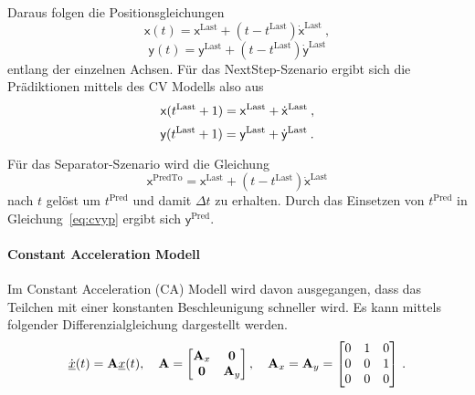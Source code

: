 Daraus folgen die Positionsgleichungen 
\begin{equation*}
    \mathsf{x}(t) = \mathsf{x}^{\text{Last}} + (t - t^{\text{Last}})\dot{\mathsf{x}}^{\text{Last}} \: ,
\end{equation*}
\begin{equation*}
    \mathsf{y}(t) = \mathsf{y}^{\text{Last}} + (t - t^{\text{Last}})\dot{\mathsf{y}}^{\text{Last}}
\end{equation*}
% 
entlang der einzelnen Achsen.
Für das NextStep-Szenario ergibt sich die Prädiktionen mittels des CV Modells also aus
\begin{equation*}
    \mathsf{x}(t{^{\text{Last}}}+1) = \mathsf{x}^{\text{Last}} + \dot{\mathsf{x}}^{\text{Last}} \: ,
\end{equation*}
\begin{equation}
    \label{eq:cvyp}
    \mathsf{y}(t{^{\text{Last}}}+1) = \mathsf{y}^{\text{Last}} + \dot{\mathsf{y}}^{\text{Last}} \: .
\end{equation}

Für das Separator-Szenario wird die Gleichung 
% 
\begin{equation*}
    \mathsf{x}^{\text{PredTo}} = \mathsf{x}^{\text{Last}} + (t - t^{\text{Last}})\dot{\mathsf{x}}^{\text{Last}}
\end{equation*}
% 
nach \(t\) gelöst um  \(t^{\text{Pred}}\) und damit \(\Delta t\) zu erhalten.
Durch das Einsetzen von \(t^{\text{Pred}}\) in Gleichung~\eqref{eq:cvyp} ergibt sich \(\mathsf{y}^{\text{Pred}}\).

\paragraph{Constant Acceleration Modell}

Im Constant Acceleration (CA) Modell wird davon ausgegangen, dass das Teilchen mit einer konstanten Beschleunigung schneller wird.
Es kann mittels folgender Differenzialgleichung dargestellt werden.
% 
\begin{align*} \label{eq:CADiff}
    \dot{{\underline{x}}}(t) = {{\mathbf{A}}}{\underline{x}}(t), \quad {\ensuremath{{\mathbf{A}}}} = 
    \begin{bmatrix}
        {\ensuremath{{\mathbf{A}}}}_x & \boldsymbol{0} \\
        \boldsymbol{0} & {{\mathbf{A}}}_y
    \end{bmatrix} 
    , \quad
    {\ensuremath{{\mathbf{A}}}}_x = {{\mathbf{A}}}_y = 
    \begin{bmatrix}
        0 & 1 & 0 \\
        0 & 0 & 1 \\
        0 & 0 & 0
    \end{bmatrix} \, .
\end{align*}

